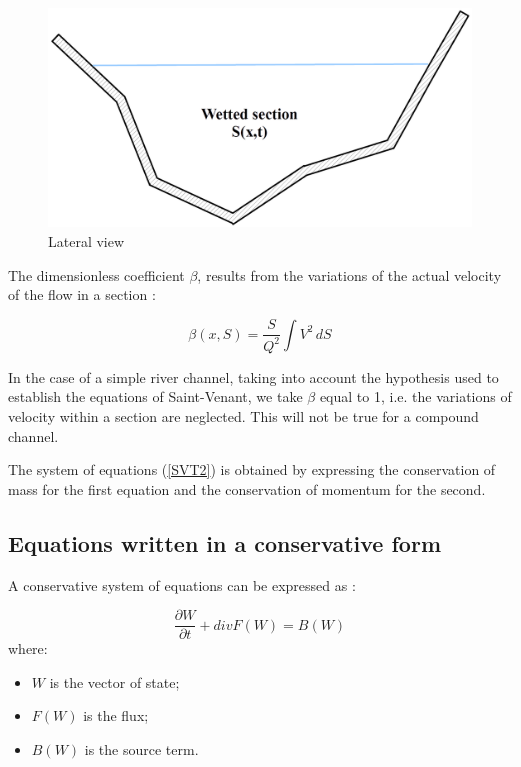 \begin{figure}[H]
 \begin{center}
  \includegraphics[width=\textwidth]{Figures/VueLat.png}
  \caption{Lateral view}
 \end{center}
\end{figure}

The dimensionless coefficient $\beta$, results from the variations of the actual velocity of the flow in a section :

\begin{equation}
 \beta(x,S) = \frac{S}{Q^2} \int V^2 \,dS
\end{equation}

In the case of a simple river channel, taking into account the hypothesis used to establish the equations of Saint-Venant, we take $\beta$ equal to 1, i.e. the variations of velocity within a section are neglected. This will not be true for a compound channel.


The system of equations (\ref{SVT2}) is obtained by expressing the conservation of mass for the first equation and the conservation of momentum for the second.

\subsection{Equations written in a conservative form}

A conservative system of equations can be expressed as :

\begin{equation}
  \frac{\partial W}{\partial t} + divF(W) = B(W)
\end{equation}
where:
\begin{itemize}
 \item $W$ is the vector of state;
 \item $F(W)$ is the flux;
 \item $B(W)$ is the source term.
\end{itemize}

